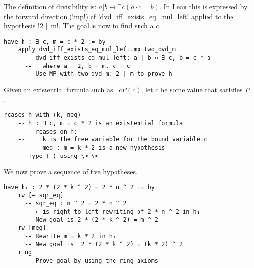 The definition of divisibility is: $a|b\leftrightarrow \exists c ( a\cdot c = b)$. In Lean this is expressed by the forward direction (!mp!) of !dvd_iff_exists_eq_mul_left! applied to the hypothesis !2 ∣ m!. The goal is now to find such a $c$.
\begin{Verbatim}[firstnumber=last]
  have h : ∃ c, m = c * 2 := by
    apply dvd_iff_exists_eq_mul_left.mp two_dvd_m
      -- dvd_iff_exists_eq_mul_left: a ∣ b ↔ ∃ c, b = c * a
      --   where a = 2, b = m, c = c
      -- Use MP with two_dvd_m: 2 ∣ m to prove h
\end{Verbatim}
Given an existential formula such as $\exists c P(c)$, let $c$ be some value that satisfies $P$.
\begin{Verbatim}[firstnumber=last]
  rcases h with ⟨k, meq⟩
    -- h : ∃ c, m = c * 2 is an existential formula
    --   rcases on h:
    --     k is the free variable for the bound variable c
    --     meq : m = k * 2 is a new hypothesis
    -- Type ⟨ ⟩ using \< \>
\end{Verbatim}


\begin{center}
\setlength{\fboxrule}{1pt}
\end{center}

We now prove a sequence of five hypotheses.
\begin{Verbatim}[firstnumber=last]
  have h₁ : 2 * (2 * k ^ 2) = 2 * n ^ 2 := by
    rw [← sqr_eq]
      -- sqr_eq : m ^ 2 = 2 * n ^ 2
      -- ← is right to left rewriting of 2 * n ^ 2 in h₁
      -- New goal is 2 * (2 * k ^ 2) = m ^ 2
    rw [meq]
      -- Rewrite m = k * 2 in h₁
      -- New goal is  2 * (2 * k ^ 2) = (k * 2) ^ 2
    ring
      -- Prove goal by using the ring axioms
\end{Verbatim}


